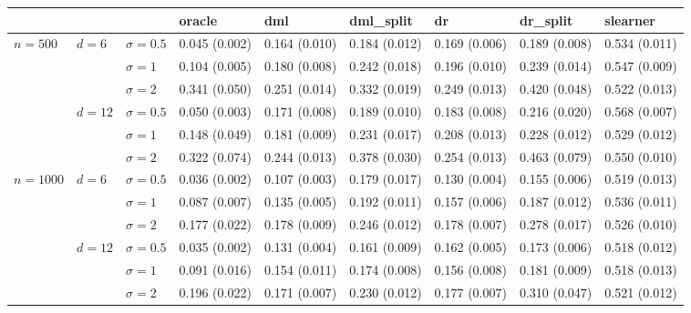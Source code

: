 \documentclass[11pt]{article} %
\theoremstyle{theorem}  %
\theoremstyle{plain}
\begin{document}
\begin{figure}[H]
\scriptsize
\centering
\begin{tabular}{lllllllll}
\toprule
         &        &            &         oracle &            dml &     dml\_split &             dr &      dr\_split &       slearner \\
\midrule
\multirow{6}{*}{$n=500$} & \multirow{3}{*}{$d=6$} & $\sigma=0.5$ &  0.045 (0.002) &  0.164 (0.010) &  0.184 (0.012) &  0.169 (0.006) &  0.189 (0.008) &  0.534 (0.011) \\
         &        & $\sigma=1$ &  0.104 (0.005) &  0.180 (0.008) &  0.242 (0.018) &  0.196 (0.010) &  0.239 (0.014) &  0.547 (0.009) \\
         &        & $\sigma=2$ &  0.341 (0.050) &  0.251 (0.014) &  0.332 (0.019) &  0.249 (0.013) &  0.420 (0.048) &  0.522 (0.013) \\
\cline{2-9}
         & \multirow{3}{*}{$d=12$} & $\sigma=0.5$ &  0.050 (0.003) &  0.171 (0.008) &  0.189 (0.010) &  0.183 (0.008) &  0.216 (0.020) &  0.568 (0.007) \\
         &        & $\sigma=1$ &  0.148 (0.049) &  0.181 (0.009) &  0.231 (0.017) &  0.208 (0.013) &  0.228 (0.012) &  0.529 (0.012) \\
         &        & $\sigma=2$ &  0.322 (0.074) &  0.244 (0.013) &  0.378 (0.030) &  0.254 (0.013) &  0.463 (0.079) &  0.550 (0.010) \\
\cline{1-9}
\cline{2-9}
\multirow{6}{*}{$n=1000$} & \multirow{3}{*}{$d=6$} & $\sigma=0.5$ &  0.036 (0.002) &  0.107 (0.003) &  0.179 (0.017) &  0.130 (0.004) &  0.155 (0.006) &  0.519 (0.013) \\
         &        & $\sigma=1$ &  0.087 (0.007) &  0.135 (0.005) &  0.192 (0.011) &  0.157 (0.006) &  0.187 (0.012) &  0.536 (0.011) \\
         &        & $\sigma=2$ &  0.177 (0.022) &  0.178 (0.009) &  0.246 (0.012) &  0.178 (0.007) &  0.278 (0.017) &  0.526 (0.010) \\
\cline{2-9}
         & \multirow{3}{*}{$d=12$} & $\sigma=0.5$ &  0.035 (0.002) &  0.131 (0.004) &  0.161 (0.009) &  0.162 (0.005) &  0.173 (0.006) &  0.518 (0.012) \\
         &        & $\sigma=1$ &  0.091 (0.016) &  0.154 (0.011) &  0.174 (0.008) &  0.156 (0.008) &  0.181 (0.009) &  0.518 (0.013) \\
         &        & $\sigma=2$ &  0.196 (0.022) &  0.171 (0.007) &  0.230 (0.012) &  0.177 (0.007) &  0.310 (0.047) &  0.521 (0.012) \\

\end{tabular}
\end{figure}
\end{document}
